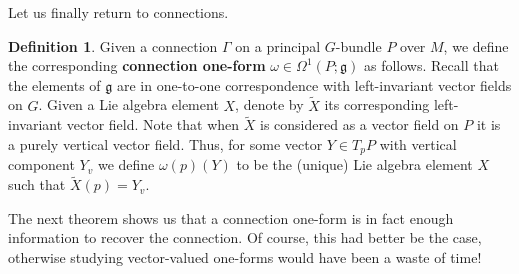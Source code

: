 \documentclass{book}
\newcommand{\fr}{\mathfrak}
\theoremstyle{plain}
\theoremstyle{definition}
\newtheorem{defn}{Definition}
\theoremstyle{remark}
\begin{document}
Let us finally return to connections.
\begin{defn}
    Given a connection $\Gamma$ on a principal $G$-bundle $P$ over $M$, we define the corresponding \textbf{connection one-form} $\omega\in \Omega^1(P;\fr g)$
    as follows. Recall that the elements of $\fr g$ are in one-to-one correspondence with left-invariant vector fields on $G$. Given a Lie algebra
    element $X$, denote by $\tilde X$ its corresponding left-invariant vector field. Note that when $\tilde X$ is considered
    as a vector field on $P$ it is a purely vertical vector field. Thus, for some vector $Y\in T_pP$ with vertical component $Y_v$ we define
    $\omega(p)(Y)$ to be the (unique) Lie algebra element $X$ such that $\tilde X(p)=Y_v$.
\end{defn}

The next theorem shows us that a connection one-form is in fact enough information to recover the connection. Of course, this had better be the case, otherwise studying vector-valued one-forms would have been a waste of time! 
\end{document}
